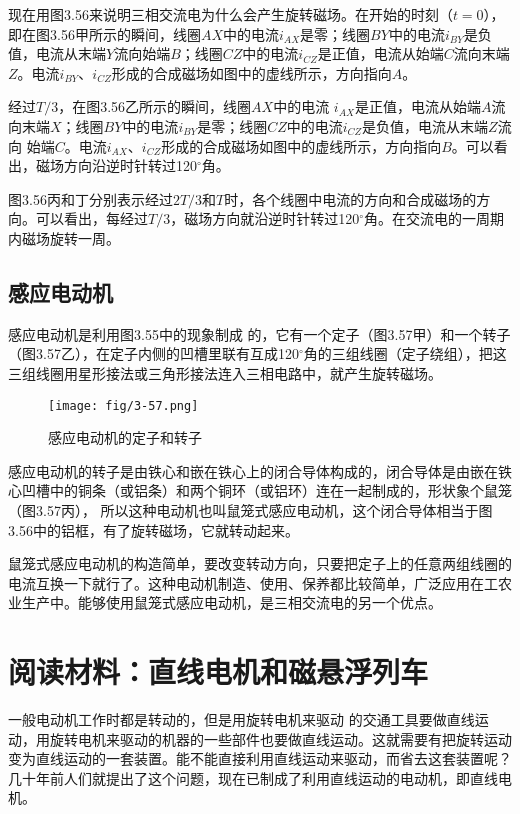现在用图3.56来说明三相交流电为什么会产生旋转磁场。在开始的时刻（$t=0$），即在图3.56甲所示的瞬间，线圈$AX$中的电流$i_{AX}$是零；线圈$BY$中的电流$i_{BY}$是负值，电流从末端$Y$流向始端$B$；线圈$CZ$中的电流$i_{CZ}$是正值，电流从始端$C$流向末端$Z$。电流$i_{BY}$、$i_{CZ}$形成的合成磁场如图中的虚线所示，方向指向$A$。

经过$T/3$，在图3.56乙所示的瞬间，线圈$AX$中的电流
$i_{AX}$是正值，电流从始端$A$流向末端$X$；线圈$BY$中的电流$i_{BY}$是零；线圈$CZ$中的电流$i_{CZ}$是负值，电流从末端$Z$流向
始端$C$。电流$i_{AX}$、$i_{CZ}$形成的合成磁场如图中的虚线所示，方向指向$B$。可以看出，磁场方向沿逆时针转过120$^\circ$角。

图3.56丙和丁分别表示经过$2T/3$和$T$时，各个线圈中电流的方向和合成磁场的方向。可以看出，每经过$T/3$，磁场方向就沿逆时针转过120$^\circ$角。在交流电的一周期内磁场旋转一周。

\subsection{感应电动机}

感应电动机是利用图3.55中的现象制成
的，它有一个定子（图3.57甲）和一个转子（图3.57乙），在定子内侧的凹槽里联有互成120$^\circ$角的三组线圈（定子绕组），把这三组线圈用星形接法或三角形接法连入三相电路中，就产生旋转磁场。
\begin{figure}[htp]\centering
\texttt{[image: fig/3-57.png]}
\caption{感应电动机的定子和转子}
\end{figure}

感应电动机的转子是由铁心和嵌在铁心上的闭合导体构成的，闭合导体是由嵌在铁心凹槽中的铜条（或铝条）和两个铜环（或铝环）连在一起制成的，形状象个鼠笼（图3.57丙），
所以这种电动机也叫鼠笼式感应电动机，这个闭合导体相当于图3.56中的铝框，有了旋转磁场，它就转动起来。

鼠笼式感应电动机的构造简单，要改变转动方向，只要把定子上的任意两组线圈的电流互换一下就行了。这种电动机制造、使用、保养都比较简单，广泛应用在工农业生产中。能够使用鼠笼式感应电动机，是三相交流电的另一个优点。

\section*{阅读材料：直线电机和磁悬浮列车}

一般电动机工作时都是转动的，但是用旋转电机来驱动
的交通工具要做直线运动，用旋转电机来驱动的机器的一些部件也要做直线运动。这就需要有把旋转运动变为直线运动的一套装置。能不能直接利用直线运动来驱动，而省去这套装置呢？几十年前人们就提出了这个问题，现在已制成了利用直线运动的电动机，即直线电机。

